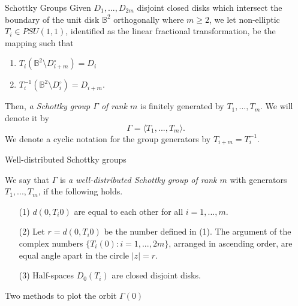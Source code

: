 \documentclass[final]{beamer}
\newlength{\onecolwid}
\begin{document}
\begin{frame}[t]
\begin{columns}[t]
\begin{column}{\onecolwid}
\begin{footnotesize}
\begin{block}{Schottky Groups}
Given $D_1,...,D_{2m}$ disjoint closed disks which intersect the boundary of the unit disk $\mathbb{B}^2$ orthogonally where $m\geq 2$, we let non-elliptic $T_i\in PSU (1,1)$, identified as the linear fractional transformation, be the mapping such that 
\begin{enumerate}
\item $T_i (\mathbb{B}^2\setminus D^{\circ}_{i+m}) = D_{i}$
\item $T_i^{-1}\left( \mathbb{B}^2\setminus D^{\circ}_{i}\right)=D_{i+m}$.
\end{enumerate}
Then, \textit{a Schottky group $\Gamma$ of rank $m$} is finitely generated by $T_1,...,T_m$. We will denote it by  
$$
\Gamma = \langle T_1,...,T_m\rangle. 
$$
We denote a cyclic notation for the group generators by $T_{i+m} = T_i^{-1}$.  
\end{block}
\end{footnotesize}


\begin{footnotesize}
\begin{block}{Well-distributed Schottky groups}

We say that $\Gamma$ is \textit{a well-distributed Schottky group of rank $m$}  with generators $T_1,...,T_m$, if the following holds.

\begin{enumerate}
\item[(1)] $d(0,T_i0)$ are equal to each other for all $i=1,...,m$. 
\item[(2)] Let $r = d(0,T_i0)$ be the number defined in (1). The argument of the complex numbers $\{T_i (0): i=1,...,2m\}$, arranged in ascending order, are equal angle apart in the circle  $|z|=r$. 
\item[(3)] Half-spaces $D_0(T_i)$ are closed disjoint disks. 

\end{enumerate}

\end{block}
\end{footnotesize}




\begin{footnotesize}
\begin{block}{Two methods to plot the orbit $\Gamma(0)$}



\end{block}
\end{footnotesize}
\end{column}
\end{columns}
\end{frame}
\end{document}
